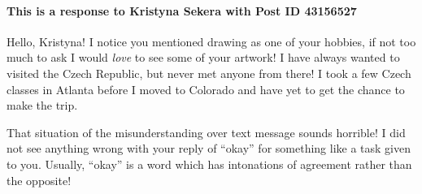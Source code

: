     \paragraph{This is a response to Kristyna Sekera with Post ID 43156527}
      Hello, Kristyna! I notice you mentioned drawing as one of your hobbies,
        if not too much to ask I would \textit{love} to see some of your
        artwork! I have always wanted to visited the Czech Republic, but never
        met anyone from there! I took a few Czech classes in Atlanta before I
        moved to Colorado and have yet to get the chance to make the trip.

      That situation of the misunderstanding over text message sounds horrible!
        I did not see anything wrong with your reply of ``okay'' for something
        like a task given to you. Usually, ``okay'' is a word which has
        intonations of agreement rather than the opposite!
